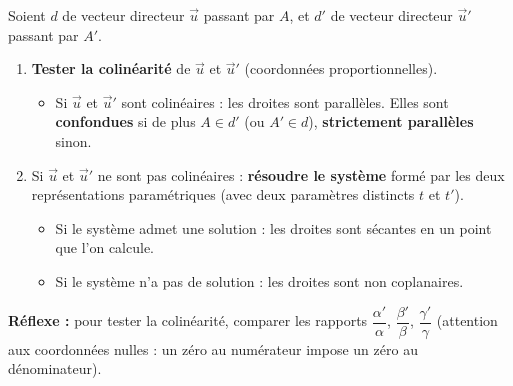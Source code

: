 \documentclass[11pt]{article}
\newcommand{\cle}[1]{{\popxbold\color{popdark}#1}}
\begin{document}
\begin{methode}
Soient $d$ de vecteur directeur $\vec{u}$ passant par $A$, et $d'$ de vecteur directeur $\vec{u}'$ passant par $A'$.
\begin{enumerate}
\item \textbf{Tester la colinéarité} de $\vec{u}$ et $\vec{u}'$ (coordonnées proportionnelles).
\begin{itemize}
\item Si $\vec{u}$ et $\vec{u}'$ sont colinéaires : les droites sont \cle{parallèles}. Elles sont \textbf{confondues} si de plus $A\in d'$ (ou $A'\in d$), \textbf{strictement parallèles} sinon.
\end{itemize}
\item Si $\vec{u}$ et $\vec{u}'$ ne sont pas colinéaires : \textbf{résoudre le système} formé par les deux représentations paramétriques (avec deux paramètres distincts $t$ et $t'$).
\begin{itemize}
\item Si le système admet une solution : les droites sont \cle{sécantes} en un point que l'on calcule.
\item Si le système n'a pas de solution : les droites sont \cle{non coplanaires}.
\end{itemize}
\end{enumerate}
\textbf{Réflexe :} pour tester la colinéarité, comparer les rapports $\dfrac{\alpha'}{\alpha}$, $\dfrac{\beta'}{\beta}$, $\dfrac{\gamma'}{\gamma}$ (attention aux coordonnées nulles : un zéro au numérateur impose un zéro au dénominateur).
\end{methode}
\end{document}
